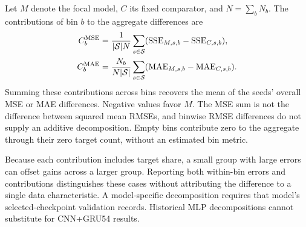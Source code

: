 Let $M$ denote the focal model, $C$ its fixed comparator, and
$N=\sum_bN_b$. The contributions of bin $b$ to the aggregate differences are
\begin{align}
 C_b^{\rm MSE}&=\frac{1}{|\mathcal S|N}\sum_{s\in\mathcal S}
  (\mathrm{SSE}_{M,s,b}-\mathrm{SSE}_{C,s,b}),
  \label{eq:strata-mse-contribution}\\
 C_b^{\rm MAE}&=\frac{N_b}{N|\mathcal S|}\sum_{s\in\mathcal S}
  (\mathrm{MAE}_{M,s,b}-\mathrm{MAE}_{C,s,b}).
  \label{eq:strata-mae-contribution}
\end{align}
Summing these contributions across bins recovers the mean of the seeds'
overall MSE or MAE differences. Negative values favor $M$. The MSE sum is
not the difference between squared mean RMSEs, and binwise RMSE differences
do not supply an additive decomposition. Empty bins contribute zero to the
aggregate through their zero target count, without an estimated bin metric.

Because each contribution includes target share, a small group with large
errors can offset gains across a larger group. Reporting both within-bin
errors and contributions distinguishes these cases without attributing the
difference to a single data characteristic. A model-specific decomposition
requires that model's selected-checkpoint validation records. Historical
MLP decompositions cannot substitute for CNN+GRU54 results.
